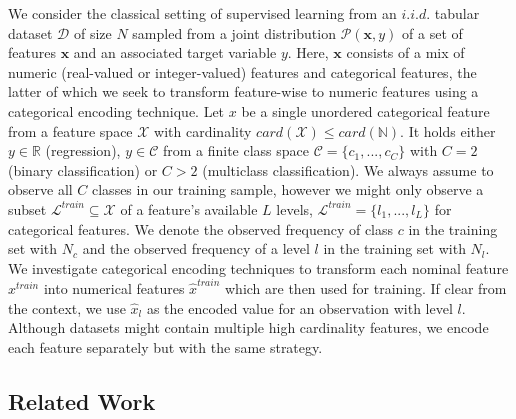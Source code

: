 \documentclass[smallextended]{svjour3}       %
\begin{document}
We consider the classical setting of supervised learning from an \(i.i.d.\) tabular dataset \(\mathcal{D}\) of size \(N\) sampled from a joint distribution \(\mathcal{P}(\bm{x}, y)\) of a set of features \(\bm{x}\) and an associated target variable \(y\).
Here, \(\bm{x}\) consists of a mix of numeric (real-valued or integer-valued) features and categorical features, the latter of which we seek to transform feature-wise to numeric features using a categorical encoding technique.
Let \(x\) be a single unordered categorical feature from a feature space \(\mathcal{X}\) with cardinality \(card(\mathcal{X}) \leq card(\mathbb{N})\).
It holds either \(y \in \mathbb{R}\) (regression), \(y \in \mathcal{C}\) from a finite class space \(\mathcal{C} = \{c_1, ..., c_C\}\) with \(C = 2\) (binary classification) or \(C > 2\) (multiclass classification). We always assume to observe all \(C\) classes in our training sample, however we might only observe a subset \(\mathcal{L}^{train} \subseteq \mathcal{X}\) of a feature's available \(L\) levels, \(\mathcal{L}^{train} = \{l_1, ..., l_L\}\) for categorical features. We denote the observed frequency of class \(c\) in the training set with \(N_c\) and the observed frequency of a level \(l\) in the training set with \(N_l\).
We investigate categorical encoding techniques to transform each nominal feature \(x^{train}\) into numerical features \(\hat{x}^{train}\) which are then used for training. If clear from the context, we use \(\hat{x}_l\) as the encoded value for an observation with level \(l\). Although datasets might contain multiple high cardinality features, we encode each feature separately but with the same strategy.

\hypertarget{related-work}{%
\subsection{Related Work}\label{related-work}}
\end{document}

